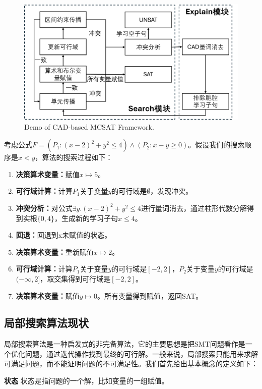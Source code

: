 \begin{figure}[t]
    \centering
    \includegraphics[width=0.6\columnwidth]{Img/mcsat.png}
     {Demo of CAD-based MCSAT Framework.}
    \label{fig:mcsat}
\end{figure}


\begin{example}
考虑公式$F=(P_1: (x-2)^2 + y^2 \le 4) \wedge (P_2: x - y \ge 0)$。假设我们的搜索顺序是$x < y$，算法的搜索过程如下：
\begin{enumerate}
    \item \textbf{决策算术变量：}赋值$x \mapsto 5$。
    \item \textbf{可行域计算：}计算$P_1$关于变量$y$的可行域是$\emptyset$，发现冲突。
    \item \textbf{冲突分析：}对公式$\exists y. (x-2)^2 + y^2 \le 4$进行量词消去，通过柱形代数分解得到实根$\{0, 4\}$，生成新的学习子句$x \le 4$。
    \item \textbf{回退：}回退到x未赋值的状态。
    \item \textbf{决策算术变量：}重新赋值$x \mapsto 2$。
    \item \textbf{可行域计算：}计算$P_1$关于变量$y$的可行域是$[-2, 2]$，$P_2$关于变量$y$的可行域是$(-\infty, 2]$，取交集得到可行域是$[-2, 2]$。
    \item \textbf{决策算术变量：}赋值$y \mapsto 0$。所有变量得到赋值，返回SAT。
\end{enumerate}
\label{ex:nlsat}
\end{example}

\subsection{局部搜索算法现状}
局部搜索算法是一种启发式的非完备算法，它的主要思想是把SMT问题看作是一个优化问题，通过迭代操作找到最终的可行解。一般来说，局部搜索只能用来求解可满足问题，而不能证明问题的不可满足性。我们首先给出基本概念的定义如下：

\begin{definition}{\textbf{状态}}
状态是指问题的一个解，比如变量的一组赋值。
\end{definition}

